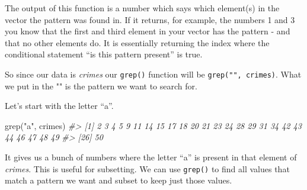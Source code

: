 \documentclass[
]{krantz}
\makeatletter
\newenvironment{Shaded}{\begin{snugshade}}{\end{snugshade}}
\newcommand{\CommentTok}[1]{\textcolor[rgb]{0.37,0.37,0.37}{\textit{#1}}}
\newcommand{\FunctionTok}[1]{\textcolor[rgb]{0,0,0}{#1}}
\newcommand{\NormalTok}[1]{#1}
\newcommand{\StringTok}[1]{\textcolor[rgb]{0.5,0.5,0.5}{#1}}
\newenvironment{kframe}{%
\medskip{}
\setlength{\fboxsep}{.8em}
 \def\at@end@of@kframe{}%
 \ifinner\ifhmode%
  \def\at@end@of@kframe{\end{minipage}}%
  \begin{minipage}{\columnwidth}%
 \fi\fi%
 \def\FrameCommand##1{\hskip\@totalleftmargin \hskip-\fboxsep
 \colorbox{shadecolor}{##1}\hskip-\fboxsep
     \hskip-\linewidth \hskip-\@totalleftmargin \hskip\columnwidth}%
 \MakeFramed {\advance\hsize-\width
   \@totalleftmargin\z@ \linewidth\hsize
   \@setminipage}}%
 {\par\unskip\endMakeFramed%
 \at@end@of@kframe}
\renewenvironment{Shaded}{\begin{kframe}}{\end{kframe}}
\makeatother
\begin{document}
The output of this function is a number which says which element(s) in the vector the pattern was found in. If it returns, for example, the numbers 1 and 3 you know that the first and third element in your vector has the pattern - and that no other elements do. It is essentially returning the index where the conditional statement ``is this pattern present'' is true.

So since our data is \emph{crimes} our \texttt{grep()} function will be \texttt{grep("",\ crimes)}. What we put in the "" is the pattern we want to search for.

Let's start with the letter ``a''.

\begin{Shaded}
\begin{Highlighting}[]
\FunctionTok{grep}\NormalTok{(}\StringTok{"a"}\NormalTok{, crimes)}
\CommentTok{\#\textgreater{}  [1]  2  3  4  5  9 11 14 15 17 18 20 21 23 24 28 29 31 34 42 43 44 46 47 48 49}
\CommentTok{\#\textgreater{} [26] 50}
\end{Highlighting}
\end{Shaded}

It gives us a bunch of numbers where the letter ``a'' is present in that element of \emph{crimes}. This is useful for subsetting. We can use \texttt{grep()} to find all values that match a pattern we want and subset to keep just those values.
\end{document}
